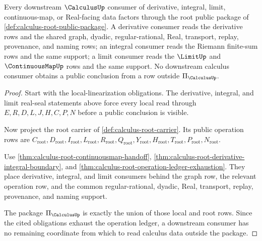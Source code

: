\begin{theorem}
\label{thm:calculus-root-public-package-readiness}
Every downstream $\CalculusUp$ consumer of derivative, integral, limit, continuous-map, or Real-facing data factors through the root public package of \autoref{def:calculus-root-public-package}. A derivative consumer reads the derivative rows and the shared graph, dyadic, regular-rational, Real, transport, replay, provenance, and naming rows; an integral consumer reads the Riemann finite-sum rows and the same support; a limit consumer reads the $\LimitUp$ and $\ContinuousMapUp$ rows and the same support. No downstream calculus consumer obtains a public conclusion from a row outside $\Pi_{\CalculusUp}$.
\end{theorem}
\begin{proof}
Start with the local-linearization obligations. The derivative, integral, and limit real-seal statements above force every local read through $E,R,D,L,J,H,C,P,N$ before a public conclusion is visible.

Now project the root carrier of \autoref{def:calculus-root-carrier}. Its public operation rows are $C_{\mathrm{root}},D_{\mathrm{root}},I_{\mathrm{root}},L_{\mathrm{root}},R_{\mathrm{root}},Q_{\mathrm{root}},Y_{\mathrm{root}},H_{\mathrm{root}},T_{\mathrm{root}},P_{\mathrm{root}},N_{\mathrm{root}}$.

Use \autoref{thm:calculus-root-continuousmap-handoff}, \autoref{thm:calculus-root-derivative-integral-boundary}, and \autoref{thm:calculus-root-operation-ledger-exhaustion}. They place derivative, integral, and limit consumers behind the graph row, the relevant operation row, and the common regular-rational, dyadic, Real, transport, replay, provenance, and naming support.

The package $\Pi_{\CalculusUp}$ is exactly the union of those local and root rows. Since the cited obligations exhaust the operation ledger, a downstream consumer has no remaining coordinate from which to read calculus data outside the package.
\end{proof}

